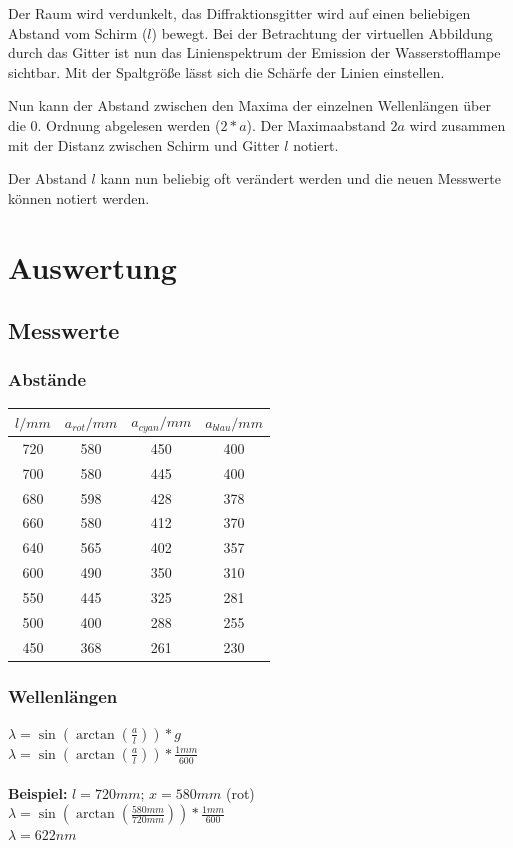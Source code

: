 \documentclass[12pt, a4paper]{article}
\begin{document}
Der Raum wird verdunkelt, das Diffraktionsgitter wird auf einen beliebigen Abstand vom Schirm ($l$) bewegt.
Bei der Betrachtung der virtuellen Abbildung durch das Gitter ist nun das Linienspektrum der Emission der Wasserstofflampe sichtbar.
Mit der Spaltgröße lässt sich die Schärfe der Linien einstellen.

Nun kann der Abstand zwischen den Maxima der einzelnen Wellenlängen über die 0. Ordnung abgelesen werden ($2*a$).
Der Maximaabstand $2a$ wird zusammen mit der Distanz zwischen Schirm und Gitter $l$ notiert.

Der Abstand $l$ kann nun beliebig oft verändert werden und die neuen Messwerte können notiert werden.

\newpage

\section{Auswertung}
\subsection{Messwerte}
\subsubsection{Abstände}
\begin{tabular}{ |c|c|c|c| }
    \hline
    $l/mm$ & $a_{rot}/mm$ & $a_{cyan}/mm$ & $a_{blau}/mm$ \\
    \hline
    \hline
    720 & 580 & 450 & 400 \\
    \hline
    700 & 580 & 445 & 400 \\
    \hline
    680 & 598 & 428 & 378 \\
    \hline
    660 & 580 & 412 & 370 \\
    \hline
    640 & 565 & 402 & 357 \\
    \hline
    600 & 490 & 350 & 310 \\
    \hline
    550 & 445 & 325 & 281 \\
    \hline
    500 & 400 & 288 & 255 \\
    \hline
    450 & 368 & 261 & 230 \\
    \hline
\end{tabular}

\subsubsection{Wellenlängen}
$\lambda = \sin(\arctan(\frac{a}{l})) * g$\\
$\lambda = \sin(\arctan(\frac{a}{l})) * \frac{1mm}{600}$\\\\
\textbf{Beispiel:} $l = 720mm$; $x = 580mm$ (rot)\\
$\lambda = \sin(\arctan(\frac{580mm}{720mm}))*\frac{1mm}{600}$\\
$\lambda = 622nm$\\
\end{document}

